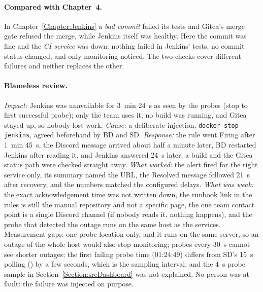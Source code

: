 \paragraph{Compared with Chapter~4.} In Chapter~\ref{Chapter:Jenkins} a \emph{bad commit} failed its tests and Gitea's merge gate refused the merge, while Jenkins itself was healthy.
Here the commit was fine and the \emph{CI service} was down: nothing failed in Jenkins' tests, no commit status changed, and only monitoring noticed. The two checks cover different failures and neither replaces the other.

\paragraph{Blameless review.} \emph{Impact:} Jenkins was unavailable for 3~min 24~s as seen by the probes (stop to first successful probe); only the team uses it, no build was running, and Gitea stayed up, so nobody lost work.
\emph{Cause:} a deliberate injection, \texttt{docker stop jenkins}, agreed beforehand by BD and SD. \emph{Response:} the rule went Firing after 1~min 45~s, the Discord message arrived about half a minute later, BD restarted Jenkins after reading it, and
Jenkins answered 24~s later; a build and the Gitea status path were checked straight away. \emph{What worked:} the alert fired for the right service only, its summary named the URL, the Resolved message followed 21~s after recovery, and the
numbers matched the configured delays. \emph{What was weak:} the exact acknowledgement time was not written down, the runbook link in the rules is still the manual repository and not a specific page, the one team contact point is a single Discord channel
(if nobody reads it, nothing happens), and the probe that detected the outage runs on the same host as the services.
Measurement gaps: one probe location only, and it runs on the same server, so an outage of the whole host would also stop monitoring; probes every 30~s cannot see shorter outages; the first failing probe time (01:24:49) differs from SD's 15~s polling
() by a few seconds, which is the sampling interval; and the 4~s probe sample in Section~\ref{Section:sreDashboard} was not explained. No person was at fault: the failure was injected on purpose.

